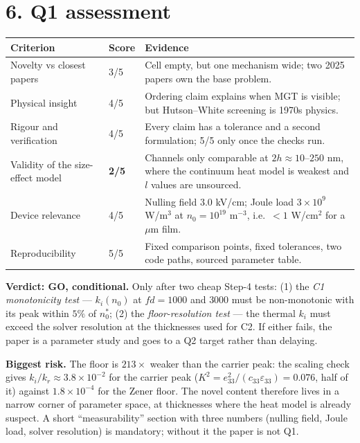 \documentclass[11pt]{article}
\begin{document}
\section*{6. Q1 assessment}
\begin{table}[h]
\centering\small
\begin{tabular}{p{5.2cm}p{1.2cm}p{8.2cm}}
\hline
Criterion & Score & Evidence \\
\hline
Novelty vs closest papers & 3/5 & Cell empty, but one mechanism wide; two 2025 papers own the base problem. \\
Physical insight & 4/5 & Ordering claim explains when MGT is visible; but Hutson--White screening is 1970s physics. \\
Rigour and verification & 4/5 & Every claim has a tolerance and a second formulation; 5/5 only once the checks run. \\
Validity of the size-effect model & \textbf{2/5} & Channels only comparable at $2h\approx10$--$250$ nm, where the continuum heat model is weakest and $l$ values are unsourced. \\
Device relevance & 4/5 & Nulling field $3.0$ kV/cm; Joule load $3\times10^9$ W/m$^3$ at $n_0=10^{19}$ m$^{-3}$, i.e.\ $<1$ W/cm$^2$ for a $\mu$m film. \\
Reproducibility & 5/5 & Fixed comparison points, fixed tolerances, two code paths, sourced parameter table. \\
\hline
\end{tabular}
\end{table}

\textbf{Verdict: GO, conditional.} Only after two cheap Step-4 tests: (1) the \emph{C1
monotonicity test} --- $k_i(n_0)$ at $fd=1000$ and $3000$ must be non-monotonic with its peak
within $5\%$ of $n_0^{*}$; (2) the \emph{floor-resolution test} --- the thermal $k_i$ must exceed
the solver resolution at the thicknesses used for C2. If either fails, the paper is a parameter
study and goes to a Q2 target rather than delaying.

\textbf{Biggest risk.} The floor is $213\times$ weaker than the carrier peak: the scaling check
gives $k_i/k_r\approx3.8\times10^{-2}$ for the carrier peak ($K^2=e_{33}^2/(c_{33}\varepsilon_{33})
=0.076$, half of it) against $1.8\times10^{-4}$ for the Zener floor. The novel content therefore
lives in a narrow corner of parameter space, at thicknesses where the heat model is already
suspect. A short ``measurability'' section with three numbers (nulling field, Joule load, solver
resolution) is mandatory; without it the paper is not Q1.
\end{document}
